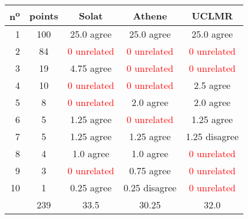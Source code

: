 \begin{center}
 \begin{tabular}{ r | c || c c c }
  n\textsuperscript{o} & points & Solat                        & Athene                       & UCLMR                        \\ \hline
  1                    & 100    & 25.0 agree                   & 25.0 agree                   & 25.0 agree                   \\
  2                    & 84     & \textcolor{red}{0 unrelated} & \textcolor{red}{0 unrelated} & \textcolor{red}{0 unrelated} \\
  3                    & 19     & 4.75 agree                   & \textcolor{red}{0 unrelated} & \textcolor{red}{0 unrelated} \\
  4                    & 10     & \textcolor{red}{0 unrelated} & \textcolor{red}{0 unrelated} & 2.5 agree                    \\
  5                    & 8      & \textcolor{red}{0 unrelated} & 2.0 agree                    & 2.0 agree                    \\
  6                    & 5      & 1.25 agree                   & \textcolor{red}{0 unrelated} & 1.25 agree                   \\
  7                    & 5      & 1.25 agree                   & 1.25 agree                   & 1.25 disagree                \\
  8                    & 4      & 1.0 agree                    & 1.0 agree                    & \textcolor{red}{0 unrelated} \\
  9                    & 3      & \textcolor{red}{0 unrelated} & 0.75 agree                   & \textcolor{red}{0 unrelated} \\
  10                   & 1      & 0.25 agree                   & 0.25 disagree                & \textcolor{red}{0 unrelated} \\ \hline
                       & 239    & 33.5                         & 30.25                        & 32.0                         \\
 \end{tabular}
\end{center}
